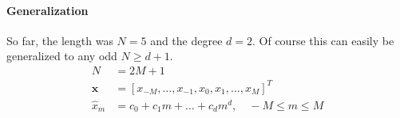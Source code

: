 \paragraph{Generalization}
So far, the length was $N=5$ and the degree $d=2$. Of course this can easily be
generalized to any odd $N \geq d+1$.
\begin{align*}
  N &= 2M + 1 \\
  \mathbf{x} &= [x_{-M},\ldots,x_{-1},x_0,x_1,\ldots,x_M]^T \\
  \hat{x}_m &= c_0 + c_1m + \ldots + c_dm^d, \quad -M \leq m \leq M
\end{align*}
